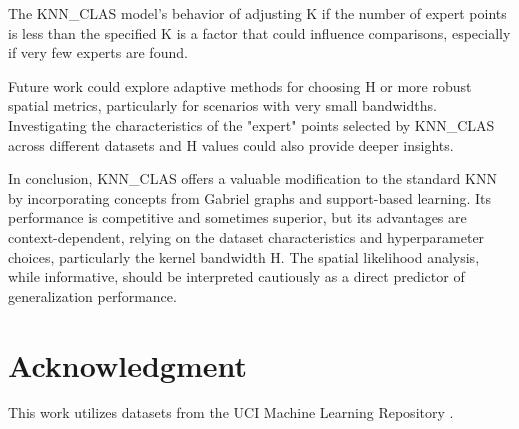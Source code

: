 \documentclass[conference]{IEEEtran}
\begin{document}
The KNN\_CLAS model's behavior of adjusting K if the number of expert points is less than the specified K is a factor that could influence comparisons, especially if very few experts are found.

Future work could explore adaptive methods for choosing H or more robust spatial metrics, particularly for scenarios with very small bandwidths. Investigating the characteristics of the "expert" points selected by KNN\_CLAS across different datasets and H values could also provide deeper insights.

In conclusion, KNN\_CLAS offers a valuable modification to the standard KNN by incorporating concepts from Gabriel graphs and support-based learning. Its performance is competitive and sometimes superior, but its advantages are context-dependent, relying on the dataset characteristics and hyperparameter choices, particularly the kernel bandwidth H. The spatial likelihood analysis, while informative, should be interpreted cautiously as a direct predictor of generalization performance.

\section*{Acknowledgment}
This work utilizes datasets from the UCI Machine Learning Repository \cite{Dua:2019}.



\end{document}
